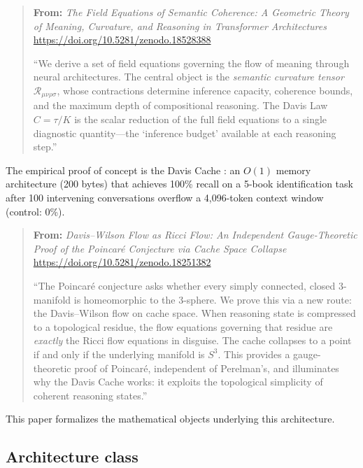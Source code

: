 \documentclass[11pt,a4paper]{article}
\theoremstyle{definition}
\theoremstyle{remark}
\begin{document}
\begin{quote}
\small
\textbf{From:} \emph{The Field Equations of Semantic Coherence: A Geometric Theory of Meaning, Curvature, and Reasoning in Transformer Architectures} \cite{davis2026field}\\
\url{https://doi.org/10.5281/zenodo.18528388}

\medskip
``We derive a set of field equations governing the flow of meaning through neural architectures. The central object is the \emph{semantic curvature tensor} $\mathcal{R}_{\mu\nu\rho\sigma}$, whose contractions determine inference capacity, coherence bounds, and the maximum depth of compositional reasoning. The Davis Law $C = \tau/K$ is the scalar reduction of the full field equations to a single diagnostic quantity---the `inference budget' available at each reasoning step.''
\end{quote}

The empirical proof of concept is the Davis Cache \cite{davis2025cache,davis2026poincare}: 
an $O(1)$ memory architecture (200 bytes) that achieves 100\% recall 
on a 5-book identification task after 100 intervening conversations 
overflow a 4,096-token context window (control: 0\%).

\begin{quote}
\small
\textbf{From:} \emph{Davis--Wilson Flow as Ricci Flow: An Independent Gauge-Theoretic Proof of the Poincar\'e Conjecture via Cache Space Collapse} \cite{davis2026poincare}\\
\url{https://doi.org/10.5281/zenodo.18251382}

\medskip
``The Poincar\'e conjecture asks whether every simply connected, closed 3-manifold is homeomorphic to the 3-sphere. We prove this via a new route: the Davis--Wilson flow on cache space. When reasoning state is compressed to a topological residue, the flow equations governing that residue are \emph{exactly} the Ricci flow equations in disguise. The cache collapses to a point if and only if the underlying manifold is $S^3$. This provides a gauge-theoretic proof of Poincar\'e, independent of Perelman's, and illuminates why the Davis Cache works: it exploits the topological simplicity of coherent reasoning states.''
\end{quote}

This paper formalizes the mathematical objects underlying this 
architecture.

\subsection{Architecture class}\label{sec:arch_class}
\end{document}
